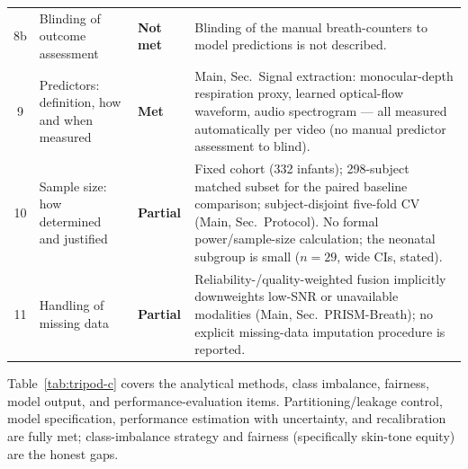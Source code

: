 \begin{table}[!tp]
\begin{tabular}{@{}c >{\raggedright\arraybackslash}p{1.65in} >{\raggedright\arraybackslash}p{0.70in} >{\raggedright\arraybackslash}p{3.35in}@{}}
8b & Blinding of outcome assessment
   & \textbf{Not met}
   & Blinding of the manual breath-counters to model predictions is not described.\\
9  & Predictors: definition, how and when measured
   & \textbf{Met}
   & Main, Sec.~Signal extraction: monocular-depth respiration proxy, learned optical-flow waveform, audio spectrogram --- all measured automatically per video (no manual predictor assessment to blind).\\
10 & Sample size: how determined and justified
   & \textbf{Partial}
   & Fixed cohort (332 infants); 298-subject matched subset for the paired baseline comparison; subject-disjoint five-fold CV (Main, Sec.~Protocol). No formal power/sample-size calculation; the neonatal subgroup is small ($n{=}29$, wide CIs, stated).\\
11 & Handling of missing data
   & \textbf{Partial}
   & Reliability-/quality-weighted fusion implicitly downweights low-SNR or unavailable modalities (Main, Sec.~PRISM-Breath); no explicit missing-data imputation procedure is reported.\\
\bottomrule
\end{tabular}
\end{table}

Table~\ref{tab:tripod-c} covers the analytical methods, class imbalance, fairness, model output, and
performance-evaluation items. Partitioning/leakage control, model specification, performance estimation with
uncertainty, and recalibration are fully met; class-imbalance strategy and fairness (specifically skin-tone
equity) are the honest gaps.

